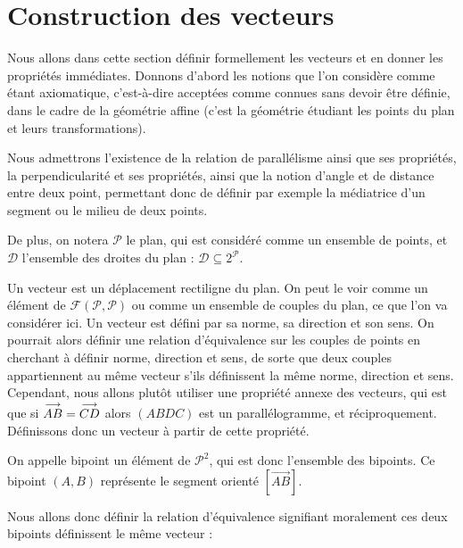 \section{Construction des vecteurs}

Nous allons dans cette section définir formellement les vecteurs et en donner les propriétés immédiates. Donnons d'abord les notions que l'on considère comme étant axiomatique, c'est-à-dire acceptées comme connues sans devoir être définie, dans le cadre de la géométrie affine (c'est la géométrie étudiant les points du plan et leurs transformations).

Nous admettrons l'existence de la relation de parallélisme ainsi que ses propriétés, la perpendicularité et ses propriétés, ainsi que la notion d'angle et de distance entre deux point, permettant donc de définir par exemple la médiatrice d'un segment ou le milieu de deux points.

De plus, on notera $\mathcal P$ le plan, qui est considéré comme un ensemble de points, et $\mathcal D$ l'ensemble des droites du plan : $\mathcal D \subseteq 2^{\mathcal P}$.

Un vecteur est un déplacement rectiligne du plan. On peut le voir comme un élément de $\mathcal F(\mathcal P,\mathcal P)$ ou comme un ensemble de couples du plan, ce que l'on va considérer ici. Un vecteur est défini par sa norme, sa direction et son sens. On pourrait alors définir une relation d'équivalence sur les couples de points en cherchant à définir norme, direction et sens, de sorte que deux couples appartiennent au même vecteur s'ils définissent la même norme, direction et sens. Cependant, nous allons plutôt utiliser une propriété annexe des vecteurs, qui est que si $\overset{\longrightarrow}{AB}=\overset{\longrightarrow}{CD}$ alors $(ABDC)$ est un parallélogramme, et réciproquement. Définissons donc un vecteur à partir de cette propriété.

\begin{defi}[Bipoint]
    On appelle \og bipoint\fg{} un élément de $\mathcal P^2$, qui est donc l'ensemble des bipoints. Ce bipoint $(A,B)$ représente le segment orienté $[\overset{\longrightarrow}{AB}]$.
\end{defi}

Nous allons donc définir la relation d'équivalence signifiant moralement \og ces deux bipoints définissent le même vecteur\fg{} :

